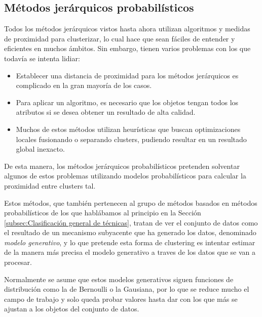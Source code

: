 \documentclass[10pt, a4paper]{article}
\begin{document}


\subsection{\textbf{Métodos jerárquicos probabilísticos}} \label{subsec:Métodos jerárquicos probabilísticos}

Todos los métodos jerárquicos vistos hasta ahora utilizan algoritmos y medidas de proximidad para clusterizar, lo cual hace que sean fáciles de entender y eficientes en muchos ámbitos. Sin embargo, tienen varios problemas con los que todavía se intenta lidiar:

\begin{itemize}
  \item Establecer una distancia de proximidad para los métodos jerárquicos es complicado en la gran mayoría de los casos.
  \item Para aplicar un algoritmo, es necesario que los objetos tengan todos los atributos si se desea obtener un resultado de alta calidad.
  \item Muchos de estos métodos utilizan heurísticas que buscan optimizaciones locales fusionando o separando clusters, pudiendo resultar en un resultado global inexacto.
\end{itemize}

De esta manera, los métodos jerárquicos probabilísticos pretenden solventar algunos de estos problemas utilizando modelos probabilísticos para calcular la proximidad entre clusters tal.

Estos métodos, que también pertenecen al grupo de métodos basados en métodos probabilísticos de los que hablábamos al principio en la Sección \ref{subsec:Clasificación general de técnicas}, tratan de ver el conjunto de datos como el resultado de un mecanismo subyacente que ha generado los datos, denominado \textit{modelo generativo}, y lo que pretende esta forma de clustering es intentar estimar de la manera más precisa el modelo generativo a traves de los datos que se van a procesar. 

Normalmente se asume que estos modelos generativos siguen funciones de distribución como la de Bernoulli o la Gausiana, por lo que se reduce mucho el campo de trabajo y solo queda probar valores hasta dar con los que más se ajustan a los objetos del conjunto de datos. 


\end{document}
